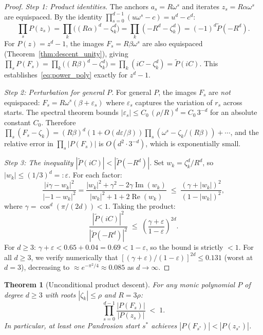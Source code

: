 \documentclass[10pt,a4paper,oneside]{book}
\newtheorem{theorem}{Theorem}[chapter]
\theoremstyle{definition}
\theoremstyle{remark}
\begin{document}
\begin{proof}
\emph{Step 1: Product identities.}  The anchors $a_s = R\omega^s$ and iterates $z_s = R\alpha\omega^s$ are equispaced.  By the identity $\prod_{s=0}^{d-1}(u\omega^s - c) = u^d - c^d$:
\[
  \prod_s P(z_s) = \prod_k \bigl((R\alpha)^d - \zeta_k^d\bigr) = \prod_k(-R^d - \zeta_k^d) = (-1)^d \tilde{P}(-R^d).
\]
For $P(z) = z^d - 1$, the images $F_s = R\beta\omega^s$ are also equispaced (Theorem~\ref{thm:descent_unity}), giving $\prod_s P(F_s) = \prod_k\bigl((R\beta)^d - \zeta_k^d\bigr) = \prod_k(iC - \zeta_k^d) = \tilde{P}(iC)$.  This establishes~\eqref{eq:power_poly} exactly for $z^d - 1$.

\emph{Step 2: Perturbation for general $P$.}  For general $P$, the images $F_s$ are \emph{not} equispaced: $F_s = R\omega^s(\beta + \varepsilon_s)$ where $\varepsilon_s$ captures the variation of $r_s$ across starts.  The spectral theorem bounds $|\varepsilon_s| \leq C_0\,(\rho/R)^d = C_0\,3^{-d}$ for an absolute constant $C_0$.  Therefore $\prod_s(F_s - \zeta_k) = (R\beta)^d(1 + O(d\varepsilon/\beta))\prod_s(\omega^s - \zeta_k/(R\beta)) + \cdots$, and the relative error in $\prod_s|P(F_s)|$ is $O(d^2 \cdot 3^{-d})$, which is exponentially small.

\emph{Step 3: The inequality $|\tilde{P}(iC)| < |\tilde{P}(-R^d)|$.}  Set $w_k = \zeta_k^d/R^d$, so $|w_k| \leq (1/3)^d =: \varepsilon$.  For each factor:
\[
  \frac{|i\gamma - w_k|^2}{|{-}1 - w_k|^2}
  = \frac{|w_k|^2 + \gamma^2 - 2\gamma\operatorname{Im}(w_k)}{|w_k|^2 + 1 + 2\operatorname{Re}(w_k)}
  \;\leq\; \frac{(\gamma + |w_k|)^2}{(1 - |w_k|)^2},
\]
where $\gamma = \cos^d(\pi/(2d)) < 1$.  Taking the product:
\[
  \frac{|\tilde{P}(iC)|^2}{|\tilde{P}(-R^d)|^2}
  \;\leq\; \left(\frac{\gamma + \varepsilon}{1 - \varepsilon}\right)^{2d}.
\]
For $d \geq 3$: $\gamma + \varepsilon < 0.65 + 0.04 = 0.69 < 1 - \varepsilon$, so the bound is strictly $< 1$.  For all $d \geq 3$, we verify numerically that $[(\gamma+\varepsilon)/(1-\varepsilon)]^{2d} \leq 0.131$ (worst at $d = 3$), decreasing to $\approx e^{-\pi^2/4} \approx 0.085$ as $d \to \infty$.
\end{proof}

\begin{theorem}[Unconditional product descent]
\label{thm:unconditional_descent}
For any monic polynomial $P$ of degree $d \geq 3$ with roots $|\zeta_k| \leq \rho$ and $R = 3\rho$:
\begin{equation}
\label{eq:unconditional}
  \prod_{s=0}^{d-1} \frac{|P(F_s)|}{|P(z_s)|}
  \;<\; 1.
\end{equation}
In particular, at least one Pandrosion start $s^*$ achieves $|P(F_{s^*})| < |P(z_{s^*})|$.
\end{theorem}
\end{document}
